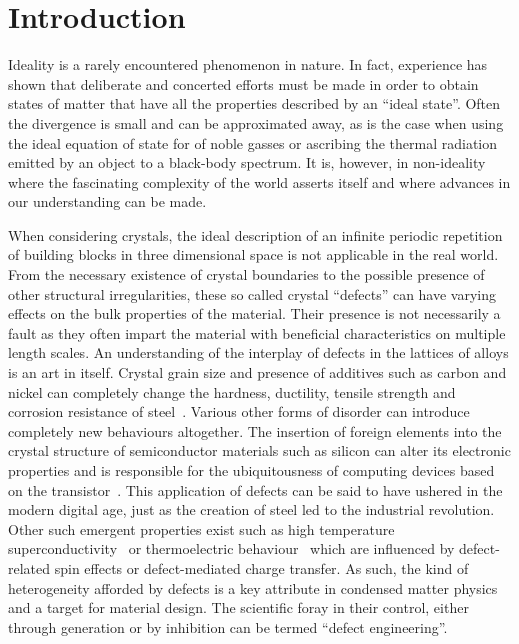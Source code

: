 
\section{Introduction}

Ideality is a rarely encountered phenomenon in nature. In fact,
experience has shown that deliberate and concerted efforts 
must be made in order to obtain states of matter that have all
the properties described by an ``ideal state''.
Often the divergence is small and can be approximated 
away, as is the case when using the ideal equation of state for 
of noble gasses or ascribing the thermal radiation emitted by an object
to a black-body spectrum. It is, however, in non-ideality where the 
fascinating complexity of the world asserts itself and where 
advances in our understanding can be made. 

When considering crystals, the ideal description of an infinite
periodic repetition of building blocks in three dimensional space is
not applicable in the real world. From the necessary existence of 
crystal boundaries to the possible presence of other structural
irregularities, these so called crystal ``defects'' can have
varying effects on the bulk properties of the material.
Their presence is not necessarily a fault as
they often impart the material with beneficial characteristics
on multiple length scales.
An understanding of the interplay of defects in the 
lattices of alloys is an art in itself.
Crystal grain size and presence of additives such as 
carbon and nickel can completely change the hardness, 
ductility, tensile strength and corrosion resistance
of steel~\cite{reed-hillPhysicalMetallurgyPrinciples1992}. 
Various other forms 
of disorder can introduce completely new behaviours altogether.
The insertion of foreign elements into the crystal structure
of semiconductor materials such as silicon can alter its 
electronic properties and is responsible for the ubiquitousness
of computing devices based on the 
transistor~\cite{levyMicroelectronicMaterialsProcesses1989}. This application
of defects can be said to have ushered in the modern digital age,
just as the creation of steel led to the industrial revolution.
Other such emergent properties exist such as high temperature 
superconductivity~\cite{leggettWhatWeKnow2006} or thermoelectric 
behaviour~\cite{peiBandEngineeringThermoelectric2012} which are influenced
by defect-related spin effects or defect-mediated charge transfer.
As such, the kind of heterogeneity afforded by defects is a key attribute 
in condensed matter physics and a target for material design.
The scientific foray in their control, either through generation or
by inhibition can be termed ``defect engineering''.

